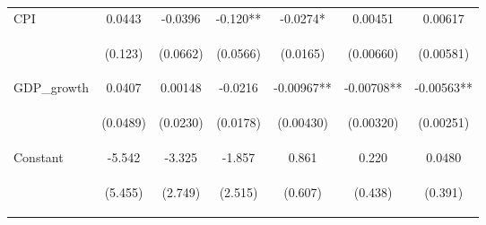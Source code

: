 \begin{tabular}{lcccccc}
CPI & 0.0443 & -0.0396 & -0.120** & -0.0274* & 0.00451 & 0.00617 \\
\vspace{4pt} & \begin{footnotesize}(0.123)\end{footnotesize} & \begin{footnotesize}(0.0662)\end{footnotesize} & \begin{footnotesize}(0.0566)\end{footnotesize} & \begin{footnotesize}(0.0165)\end{footnotesize} & \begin{footnotesize}(0.00660)\end{footnotesize} & \begin{footnotesize}(0.00581)\end{footnotesize} \\
GDP\_growth & 0.0407 & 0.00148 & -0.0216 & -0.00967** & -0.00708** & -0.00563** \\
\vspace{4pt} & \begin{footnotesize}(0.0489)\end{footnotesize} & \begin{footnotesize}(0.0230)\end{footnotesize} & \begin{footnotesize}(0.0178)\end{footnotesize} & \begin{footnotesize}(0.00430)\end{footnotesize} & \begin{footnotesize}(0.00320)\end{footnotesize} & \begin{footnotesize}(0.00251)\end{footnotesize} \\
Constant & -5.542 & -3.325 & -1.857 & 0.861 & 0.220 & 0.0480 \\
 & \begin{footnotesize}(5.455)\end{footnotesize} & \begin{footnotesize}(2.749)\end{footnotesize} & \begin{footnotesize}(2.515)\end{footnotesize} & \begin{footnotesize}(0.607)\end{footnotesize} & \begin{footnotesize}(0.438)\end{footnotesize} & \begin{footnotesize}(0.391)\end{footnotesize} \\

\end{tabular}
